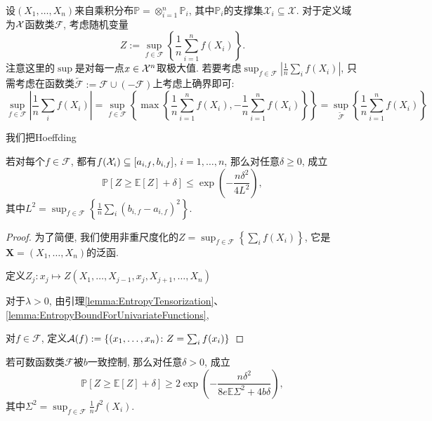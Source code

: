 设$(X_1, \dots, X_n)$来自乘积分布$\mathbb{P} = \otimes_{i=1}^n \mathbb{P}_i$, 其中$\mathbb{P}_i$的支撑集$\mathcal{X}_i \subseteq \mathcal{X}$. 
对于定义域为$\mathcal{X}$函数类$\mathscr{F}$, 考虑随机变量
\begin{equation*}
	Z := \sup_{f \in \mathscr{F}} \left\{ \frac{1}{n} \sum_{i=1}^n f(X_i) \right\}. 
\end{equation*}
注意这里的$\sup$是对每一点$x \in \mathcal{X}^n$取极大值. 
若要考虑$\sup_{f \in \mathscr{F}} \left| \frac{1}{n} \sum_i f(X_i) \right|$, 只需考虑在函数类$\tilde{\mathscr{F}} := \mathscr{F} \cup (- \mathscr{F})$上考虑上确界即可: 
\begin{equation*}
	\sup_{f \in \mathscr{F}} \left| \frac{1}{n} \sum_i f(X_i) \right|
	= \sup_{f \in \mathscr{F}} \left\{ \max \left\{ \frac{1}{n} \sum_{i=1}^n f(X_i), - \frac{1}{n} \sum_{i=1}^n f(X_i) \right\} \right\} 
	= \sup_{\tilde{\mathscr{F}}} \left\{ \frac{1}{n} \sum_{i=1}^n f(X_i) \right\}
\end{equation*}

我们把Hoeffding

\begin{theorem}[泛函Hoeffding不等式]
	若对每个$f \in \mathscr{F}$, 都有$f(\mathcal{X}_i) \subseteq  [a_{i, f}, b_{i, f}]$, $i = 1, \dots, n$,  那么对任意$\delta \geq 0$, 成立
	\begin{equation}
		\mathbb{P}[ Z \geq \mathbb{E}[Z] + \delta] 
		\leq \exp \left( - \frac{n \delta^2}{4 L^2} \right), 
	\end{equation}
	其中$L^2 = \sup_{f \in \mathscr{F}} \left\{ \frac{1}{n} \sum_i (b_{i, f} - a_{i, f})^2 \right\}$. 
\end{theorem}

\begin{proof}
	为了简便, 我们使用非重尺度化的$Z = \sup_{f \in \mathscr{F}} \left\{ \sum_i f(X_i) \right\}$, 它是$\bm X = (X_1, \dots, X_n)$的泛函.  
	
	定义$Z_j \colon x_j \mapsto Z(X_1, \dots, X_{j-1}, x_j, X_{j+1}, \dots, X_n)$
	
	对于$\lambda > 0$, 由引理\ref{lemma:EntropyTensorization}、 \ref{lemma:EntropyBoundForUnivariateFunctions}, 
	
	对$f \in \mathscr{F}$, 定义$\mathcal{A}(f) := \left\{ (x_1, \dots, x_n) \colon Z = \sum_i f(x_i) \right\}$
\end{proof}


\begin{theorem}[经验过程的Talagrand集中度]
	若可数函数类$\mathscr{F}$被$b$一致控制, 那么对任意$\delta > 0$, 成立
	\begin{equation*}
		\mathbb{P}[ Z \geq \mathbb{E}[Z] + \delta] 
		\geq 2 \exp \left( - \frac{n \delta^2}{8 e \mathbb{E} \Sigma^2 + 4 b \delta} \right), 
	\end{equation*}
	其中$\Sigma^2 = \sup_{f \in \mathscr{F}} \frac1n f^2(X_i)$. 
\end{theorem}

